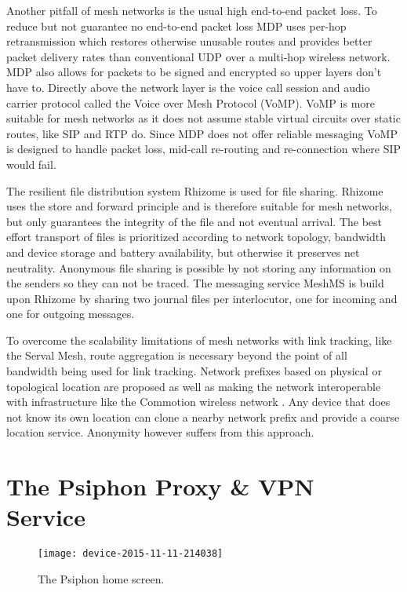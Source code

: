 \documentclass[conference,compsoc]{IEEEtran}
\begin{document}
Another pitfall of mesh networks is the usual high end-to-end packet loss.
To reduce but not guarantee no end-to-end packet loss MDP uses per-hop retransmission which restores otherwise unusable routes and provides better packet delivery rates than conventional UDP over a multi-hop wireless network.
MDP also allows for packets to be signed and encrypted so upper layers don't have to.
Directly above the network layer is the voice call session and audio carrier protocol called  the Voice over Mesh Protocol (VoMP).
VoMP is more suitable for mesh networks as it does not assume stable virtual circuits over static routes, like SIP and RTP do.
Since MDP does not offer reliable messaging VoMP is designed to handle packet loss, mid-call re-routing and re-connection where SIP would fail. \cite{serval2014dna}

The resilient file distribution system Rhizome is used for file sharing.
Rhizome uses the store and forward principle and is therefore suitable for mesh networks, but only guarantees the integrity of the file and not eventual arrival.
The best effort transport of files is prioritized according to network topology, bandwidth and device storage and battery availability, but otherwise it preserves net neutrality.
Anonymous file sharing is possible by not storing any information on the senders so they can not be traced. \cite{bettison2014servaldna}
The messaging service MeshMS is build upon Rhizome by sharing two journal files per interlocutor, one for incoming and one for outgoing messages.

To overcome the scalability limitations of mesh networks with link tracking, like the Serval Mesh, route aggregation is necessary beyond the point of all bandwidth being used for link tracking.
Network prefixes based on physical or topological location are proposed as well as making the network interoperable with infrastructure like the  Commotion wireless network \cite{commotion2012mesh}.
Any device that does not know its own location can clone a nearby network prefix and provide a coarse location service.
Anonymity however suffers from this approach.


\section{The Psiphon Proxy \& VPN Service}

\begin{figure}[b!]
\centering
\texttt{[image: device-2015-11-11-214038]}
\caption{The Psiphon home screen.}
\label{fig_psiphon}
\end{figure}
\end{document}

